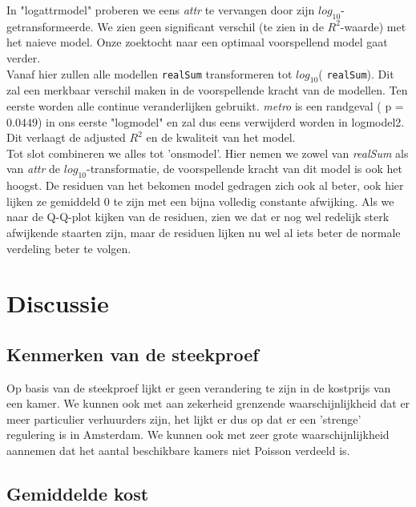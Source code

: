 \documentclass[a4paper]{kulakarticle}
\begin{document}
	In "logattrmodel" proberen we eens \textit{attr} te vervangen door zijn $log_{10}$-getransformeerde. We zien geen significant verschil (te zien in de $R^2$-waarde) met het naieve model. Onze zoektocht naar een optimaal voorspellend model gaat verder. \\
	Vanaf hier zullen alle modellen  \verb*|realSum| transformeren tot $log_{10}$( \verb*|realSum|). Dit zal een merkbaar verschil maken in de voorspellende kracht van de modellen. Ten eerste worden alle continue veranderlijken gebruikt. \textit{metro} is een randgeval ( p = $0.0449$) in ons eerste "logmodel" en zal dus eens verwijderd worden in logmodel2. Dit verlaagt de adjusted $R^2$ en de kwaliteit van het model. \\
	
	Tot slot combineren we alles tot 'onsmodel'. Hier nemen we zowel van \textit{realSum} als van \textit{attr} de $log_{10}$-transformatie, de voorspellende kracht van dit model is ook het hoogst. De residuen van het bekomen model gedragen zich ook al beter, ook hier lijken ze gemiddeld 0 te zijn met een bijna volledig constante afwijking. Als we naar de Q-Q-plot kijken van de residuen, zien we dat er nog wel redelijk sterk afwijkende staarten zijn, maar de residuen lijken nu wel al iets beter de normale verdeling beter te volgen.  
	
	\section{Discussie}
	
	\subsection{Kenmerken van de steekproef}
	Op basis van de steekproef lijkt er geen verandering te zijn in de kostprijs van een kamer. We kunnen ook met aan zekerheid grenzende waarschijnlijkheid dat er meer particulier verhuurders zijn, het lijkt er dus op dat er een 'strenge' regulering is in Amsterdam. We kunnen ook met zeer grote waarschijnlijkheid aannemen dat het aantal beschikbare kamers niet Poisson verdeeld is.
	
	\subsection{Gemiddelde kost}
	
\end{document}
